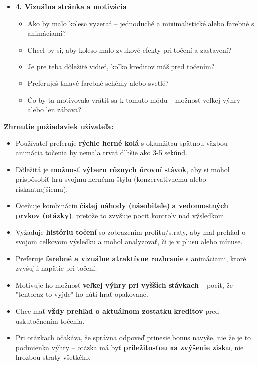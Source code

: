 \documentclass[a4paper,12pt]{article}
\begin{document}
\begin{itemize}
    	    \item \textbf{4. Vizuálna stránka a motivácia}
    	          \begin{itemize}
    	              \item Ako by malo koleso vyzerať – jednoduché a minimalistické alebo farebné s animáciami?
    	              \item Chcel by si, aby koleso malo zvukové efekty pri točení a zastavení?
    	              \item Je pre teba dôležité vidieť, koľko kreditov máš pred točením?
    	              \item Preferuješ tmavé farebné schémy alebo svetlé?
    	              \item Čo by ťa motivovalo vrátiť sa k tomuto módu – možnosť veľkej výhry alebo len zábava?
    	          \end{itemize}
    	\end{itemize}
    	
    	\textbf{Zhrnutie požiadaviek užívateľa:}
    	\begin{itemize}
    	    \item Používateľ preferuje \textbf{rýchle herné kolá} s okamžitou spätnou väzbou – animácia točenia by nemala trvať dlhšie ako 3-5 sekúnd.
    	    \item Dôležitá je \textbf{možnosť výberu rôznych úrovní stávok}, aby si mohol prispôsobiť hru svojmu hernému štýlu (konzervativnemu alebo riskantnejšiemu).
    	    \item Oceňuje kombináciu \textbf{čistej náhody (násobitele) a vedomostných prvkov (otázky)}, pretože to zvyšuje pocit kontroly nad výsledkom.
    	    \item Vyžaduje \textbf{históriu točení} so zobrazením profitu/straty, aby mal prehľad o svojom celkovom výsledku a mohol analyzovať, či je v plusu alebo mínuse.
    	    \item Preferuje \textbf{farebné a vizuálne atraktívne rozhranie} s animáciami, ktoré zvyšujú napätie pri točení.
    	    \item Motivuje ho možnosť \textbf{veľkej výhry pri vyšších stávkach} – pocit, že "tentoraz to vyjde" ho núti hrať opakovane.
    	    \item Chce mať \textbf{vždy prehľad o aktuálnom zostatku kreditov} pred uskutočnením točenia.
    	    \item Pri otázkach očakáva, že správna odpoveď prinesie bonus navyše, nie že je to podmienka výhry – otázka má byť \textbf{príležitosťou na zvýšenie zisku}, nie hrozbou straty všetkého.
    	\end{itemize}
    	
\end{document}
